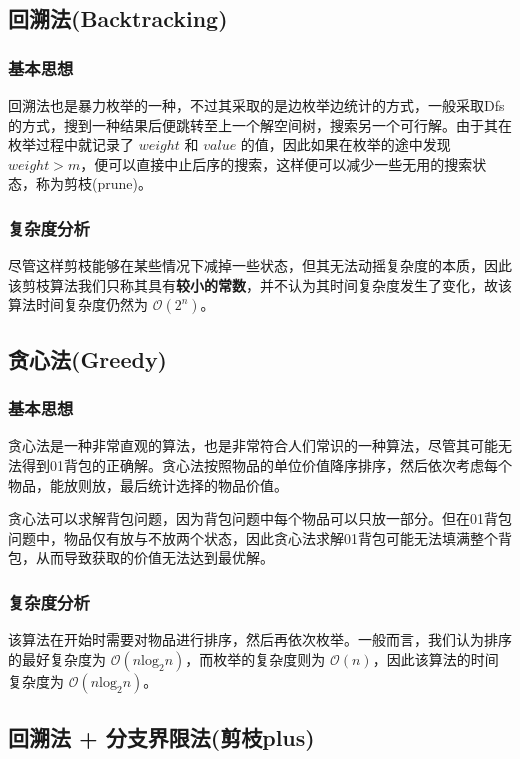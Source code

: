 \documentclass[lang=cn,11pt,a4paper]{elegantpaper}
\begin{document}
\subsection{回溯法(Backtracking)}\label{subsec-1.3}
\subsubsection{基本思想}
回溯法也是暴力枚举的一种，不过其采取的是边枚举边统计的方式，一般采取Dfs的方式，搜到一种结果后便跳转至上一个解空间树，搜索另一个可行解。由于其在枚举过程中就记录了 $weight$ 和 $value$ 的值，因此如果在枚举的途中发现 $weight > m$，便可以直接中止后序的搜索，这样便可以减少一些无用的搜索状态，称为剪枝(prune)。

\subsubsection{复杂度分析}
尽管这样剪枝能够在某些情况下减掉一些状态，但其无法动摇复杂度的本质，因此该剪枝算法我们只称其具有\textbf{较小的常数}，并不认为其时间复杂度发生了变化，故该算法时间复杂度仍然为 $\mathcal{O}\left(2^n\right)$。


\subsection{贪心法(Greedy)}
\subsubsection{基本思想}
贪心法是一种非常直观的算法，也是非常符合人们常识的一种算法，尽管其可能无法得到01背包的正确解。贪心法按照物品的单位价值降序排序，然后依次考虑每个物品，能放则放，最后统计选择的物品价值。

贪心法可以求解背包问题，因为背包问题中每个物品可以只放一部分。但在01背包问题中，物品仅有放与不放两个状态，因此贪心法求解01背包可能无法填满整个背包，从而导致获取的价值无法达到最优解。

\subsubsection{复杂度分析}
该算法在开始时需要对物品进行排序，然后再依次枚举。一般而言，我们认为排序的最好复杂度为 $\mathcal{O}\left(n\mathrm{lo}\mathrm{g}_\mathrm{2}n\right)$，而枚举的复杂度则为 $\mathcal{O}(n)$，因此该算法的时间复杂度为 $\mathcal{O}\left(n\mathrm{lo}\mathrm{g}_\mathrm{2}n\right)$。


\subsection{回溯法 + 分支界限法(剪枝plus)}
\end{document}
